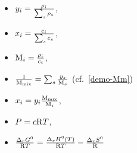 \begin{itemize}
\item $\massfrac[i] = \frac{\mass[i]}{\sum_s \mass[s]}$,
\item $\molarfrac[i] = \frac{\molar[i]}{\sum_s \molar[s]}$,
\item $\Mm[i] = \frac{\mass[i]}{\molar[i]}$,
\item $\frac{1}{\Mm[\text{mix}]} = \sum_s \frac{\massfrac[s]}{\Mm[s]}$ (cf.~\ref{demo-Mm})
\item $\molarfrac[i] = \massfrac[i] \frac{\Mm[\text{mix}]}{\Mm[i]}$,
\item $\Press = \molar\Rg \Temp$,
\item $\frac{\DGibbsZ[r]}{\Rg \Temp} = \frac{\DenthZ[r](\Temp)}{\Rg \Temp} - \frac{\DentrZ[r]}{\Rg}$
\end{itemize}

